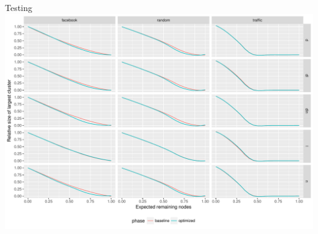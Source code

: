 \documentclass{beamer}
\begin{document}
\begin{frame}{Testing}
  \includegraphics[width=\textwidth]{results.pdf}
\end{frame}


\end{document}
